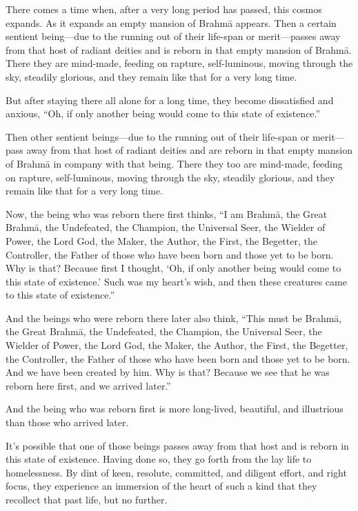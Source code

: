 \documentclass[12pt,openany]{book}%
\begin{document}
There comes a time when, after a very long period has passed, this cosmos expands. As it expands an empty mansion of \textsanskrit{Brahmā} appears. Then a certain sentient being—due to the running out of their life-span or merit—passes away from that host of radiant deities and is reborn in that empty mansion of \textsanskrit{Brahmā}. There they are mind-made, feeding on rapture, self-luminous, moving through the sky, steadily glorious, and they remain like that for a very long time. 

But after staying there all alone for a long time, they become dissatisfied and anxious, “Oh, if only another being would come to this state of existence.” 

Then other sentient beings—due to the running out of their life-span or merit—pass away from that host of radiant deities and are reborn in that empty mansion of \textsanskrit{Brahmā} in company with that being. There they too are mind-made, feeding on rapture, self-luminous, moving through the sky, steadily glorious, and they remain like that for a very long time. 

Now, the being who was reborn there first thinks, “I am \textsanskrit{Brahmā}, the Great \textsanskrit{Brahmā}, the Undefeated, the Champion, the Universal Seer, the Wielder of Power, the Lord God, the Maker, the Author, the First, the Begetter, the Controller, the Father of those who have been born and those yet to be born. Why is that? Because first I thought, ‘Oh, if only another being would come to this state of existence.’ Such was my heart’s wish, and then these creatures came to this state of existence.” 

And the beings who were reborn there later also think, “This must be \textsanskrit{Brahmā}, the Great \textsanskrit{Brahmā}, the Undefeated, the Champion, the Universal Seer, the Wielder of Power, the Lord God, the Maker, the Author, the First, the Begetter, the Controller, the Father of those who have been born and those yet to be born. And we have been created by him. Why is that? Because we see that he was reborn here first, and we arrived later.” 

And the being who was reborn first is more long-lived, beautiful, and illustrious than those who arrived later. 

It’s possible that one of those beings passes away from that host and is reborn in this state of existence. Having done so, they go forth from the lay life to homelessness. By dint of keen, resolute, committed, and diligent effort, and right focus, they experience an immersion of the heart of such a kind that they recollect that past life, but no further. 
\end{document}

